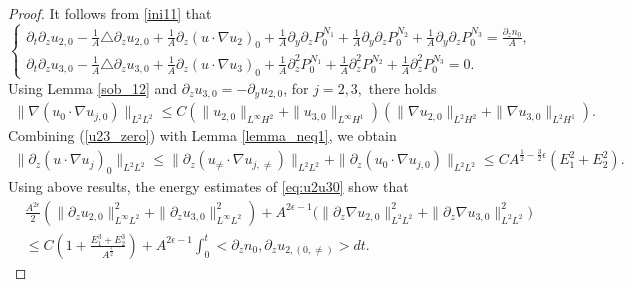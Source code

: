 \documentclass[12pt, reqno]{amsart}
\numberwithin{equation}{section}
\begin{document}
\begin{proof}
		It follows from \eqref{ini11} that 
		\begin{equation}\label{eq:u2u30}
			\left\{
			\begin{array}{lr}
				\partial_t\partial_zu_{2,0}-\frac{1}{A}\triangle \partial_zu_{2,0}
				+\frac{1}{A}\partial_z(u\cdot\nabla u_{2})_0
				+\frac{1}{A}\partial_y\partial_zP^{N_1}_0
				+\frac{1}{A}\partial_y\partial_z P^{N_2}_0+\frac{1}{A}\partial_y\partial_z P^{N_3}_0=\frac{\partial_zn_0}{A}, \\
				\partial_t\partial_zu_{3,0}-\frac{1}{A}\triangle\partial_z u_{3,0}
				+\frac{1}{A}\partial_z(u\cdot\nabla u_3)_0
				+\frac{1}{A}\partial_z^2P^{N_1}_0
				+\frac{1}{A}\partial_z^2 P^{N_2}_0
				+\frac{1}{A}\partial_z^2 P^{N_3}_0=0.
			\end{array}
			\right.
		\end{equation}
		Using Lemma \ref{sob_12} and $\partial_zu_{3,0}=-\partial_yu_{2,0}$, 
		for $j=2,3,$
		there holds
		\begin{equation}\label{u23_zero}
			\begin{aligned}	
				\|\nabla(u_{0}\cdot\nabla u_{j,0})\|_{L^2L^2}
				\leq C(\|u_{2,0}\|_{L^{\infty}H^2}+\|u_{3,0}\|_{L^{\infty}H^1})
				(\|\nabla
				u_{2,0}\|_{L^{2}H^2}+\|\nabla u_{3,0}\|_{L^{2}H^1}).
			\end{aligned}
		\end{equation}
		Combining (\ref{u23_zero}) with Lemma \ref{lemma_neq1}, we obtain
		\begin{equation}\label{u23_zero_1}
			\begin{aligned}
				\|\partial_z(u\cdot\nabla u_j)_0\|_{L^2L^2}\leq
				\|\partial_z(u_{\neq}\cdot\nabla u_{j,\neq})\|_{L^2L^2}
				+\|\partial_z(u_{0}\cdot\nabla u_{j,0})\|_{L^2L^2}
				\leq CA^{\frac12-\frac32\epsilon}(E_1^2+E_2^2).
			\end{aligned}
		\end{equation}
		Using  above results, the 
		energy estimates of \eqref{eq:u2u30} show that 
		\begin{equation}\label{u0_ans1}
			\begin{aligned}
				&\frac{A^{2\epsilon}}{2}(\|\partial_z u_{2,0}\|_{L^{\infty}L^2}^2+\|\partial_z u_{3,0}\|_{L^{\infty}L^2}^2)
				+A^{2\epsilon-1}\Big(
				\|\partial_z\nabla u_{2,0}\|_{L^2L^2}^2
				+\|\partial_z\nabla u_{3,0}\|_{L^2L^2}^2\Big)\\
				&\leq C\left(1+\frac{E_1^3+E_2^3}{A^{\frac{\epsilon}{2}}}\right)
				+A^{2\epsilon-1}
				\int_0^t<\partial_zn_{0},\partial_zu_{2,(0,\neq)}>dt.
			\end{aligned}

\end{equation}
\end{proof}
\end{document}
